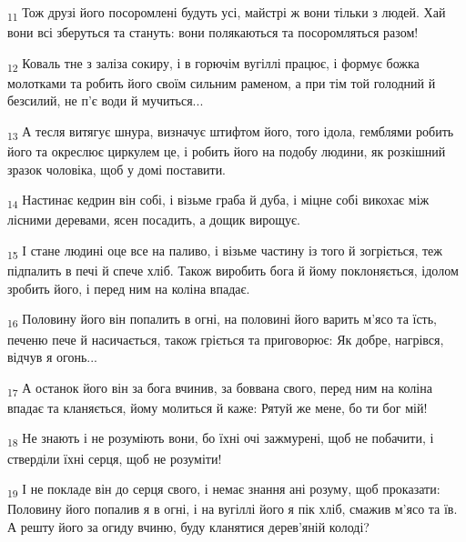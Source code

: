\begin{tcolorbox}
\textsubscript{11} Тож друзі його посоромлені будуть усі, майстрі ж вони тільки з людей. Хай вони всі зберуться та стануть: вони полякаються та посоромляться разом!
\end{tcolorbox}
\begin{tcolorbox}
\textsubscript{12} Коваль тне з заліза сокиру, і в горючім вугіллі працює, і формує божка молотками та робить його своїм сильним раменом, а при тім той голодний й безсилий, не п'є води й мучиться...
\end{tcolorbox}
\begin{tcolorbox}
\textsubscript{13} А тесля витягує шнура, визначує штифтом його, того ідола, гемблями робить його та окреслює циркулем це, і робить його на подобу людини, як розкішний зразок чоловіка, щоб у домі поставити.
\end{tcolorbox}
\begin{tcolorbox}
\textsubscript{14} Настинає кедрин він собі, і візьме граба й дуба, і міцне собі викохає між лісними деревами, ясен посадить, а дощик вирощує.
\end{tcolorbox}
\begin{tcolorbox}
\textsubscript{15} І стане людині оце все на паливо, і візьме частину із того й зогріється, теж підпалить в печі й спече хліб. Також виробить бога й йому поклоняється, ідолом зробить його, і перед ним на коліна впадає.
\end{tcolorbox}
\begin{tcolorbox}
\textsubscript{16} Половину його він попалить в огні, на половині його варить м'ясо та їсть, печеню пече й насичається, також гріється та приговорює: Як добре, нагрівся, відчув я огонь...
\end{tcolorbox}
\begin{tcolorbox}
\textsubscript{17} А останок його він за бога вчинив, за боввана свого, перед ним на коліна впадає та кланяється, йому молиться й каже: Рятуй же мене, бо ти бог мій!
\end{tcolorbox}
\begin{tcolorbox}
\textsubscript{18} Не знають і не розуміють вони, бо їхні очі зажмурені, щоб не побачити, і стверділи їхні серця, щоб не розуміти!
\end{tcolorbox}
\begin{tcolorbox}
\textsubscript{19} І не покладе він до серця свого, і немає знання ані розуму, щоб проказати: Половину його попалив я в огні, і на вугіллі його я пік хліб, смажив м'ясо та їв. А решту його за огиду вчиню, буду кланятися дерев'яній колоді?
\end{tcolorbox}
